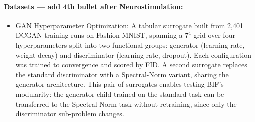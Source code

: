 %



\paragraph{Datasets --- add 4th bullet after Neurostimulation:}

\begin{itemize}
\item GAN Hyperparameter Optimization: A tabular surrogate built from 2{,}401
DCGAN training runs on Fashion-MNIST, spanning a $7^4$ grid over four
hyperparameters split into two functional groups: generator
(learning rate, weight decay) and discriminator (learning rate, dropout).
Each configuration was trained to convergence and scored by FID.
A second surrogate replaces the standard discriminator with a
Spectral-Norm variant, sharing the generator architecture.
This pair of surrogates enables testing BIF's modularity:
the generator child trained on the standard task can be transferred
to the Spectral-Norm task without retraining, since only the
discriminator sub-problem changes.
\end{itemize}



